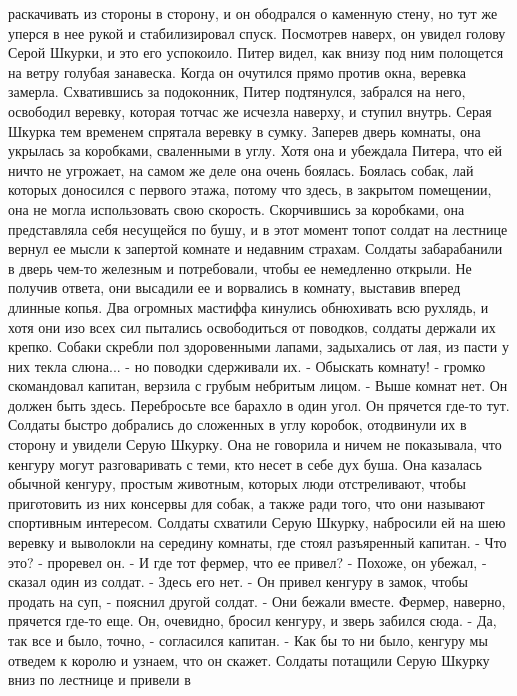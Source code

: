 раскачивать из стороны в сторону, и он ободрался о каменную стену, но 
тут же уперся в нее рукой и стабилизировал спуск. Посмотрев наверх, он 
увидел голову Серой Шкурки, и это его успокоило.
    Питер видел, как внизу под ним полощется на ветру голубая 
занавеска. Когда он очутился прямо против окна, веревка замерла. 
Схватившись за подоконник, Питер подтянулся, забрался на него, 
освободил веревку, которая тотчас же исчезла наверху, и ступил внутрь.
    Серая Шкурка тем временем спрятала веревку в сумку. Заперев дверь 
комнаты, она укрылась за коробками, сваленными в углу. Хотя она и 
убеждала Питера, что ей ничто не угрожает, на самом же деле она очень 
боялась. Боялась собак, лай которых доносился с первого этажа, потому 
что здесь, в закрытом помещении, она не могла использовать свою 
скорость. Скорчившись за коробками, она представляла себя несущейся по 
бушу, и в этот момент топот солдат на лестнице вернул ее мысли к 
запертой комнате и недавним страхам.
    Солдаты забарабанили в дверь чем-то железным и потребовали, чтобы 
ее немедленно открыли. Не получив ответа, они высадили ее и ворвались 
в комнату, выставив вперед длинные копья. Два огромных мастиффа 
кинулись обнюхивать всю рухлядь, и хотя они изо всех сил пытались 
освободиться от поводков, солдаты держали их крепко. Собаки скребли 
пол здоровенными лапами, задыхались от лая, из пасти у них текла 
слюна... - но поводки сдерживали их.
    - Обыскать комнату! - громко скомандовал капитан, верзила с грубым 
небритым лицом. - Выше комнат нет. Он должен быть здесь. Перебросьте 
все барахло в один угол. Он прячется где-то тут.
    Солдаты быстро добрались до сложенных в углу коробок, отодвинули 
их в сторону и увидели Серую Шкурку. Она не говорила и ничем не 
показывала, что кенгуру могут разговаривать с теми, кто несет в себе 
дух буша. Она казалась обычной кенгуру, простым животным, которых люди 
отстреливают, чтобы приготовить из них консервы для собак, а также 
ради того, что они называют спортивным интересом.
    Солдаты схватили Серую Шкурку, набросили ей на шею веревку и 
выволокли на середину комнаты, где стоял разъяренный капитан.
    - Что это? - проревел он. - И где тот фермер, что ее привел?
    - Похоже, он убежал, - сказал один из солдат. - Здесь его нет.
    - Он привел кенгуру в замок, чтобы продать на суп, - пояснил 
другой солдат. - Они бежали вместе. Фермер, наверно, прячется где-то 
еще. Он, очевидно, бросил кенгуру, и зверь забился сюда.
    - Да, так все и было, точно, - согласился капитан. - Как бы то ни 
было, кенгуру мы отведем к королю и узнаем, что он скажет.
    Солдаты потащили Серую Шкурку вниз по лестнице и привели в 
